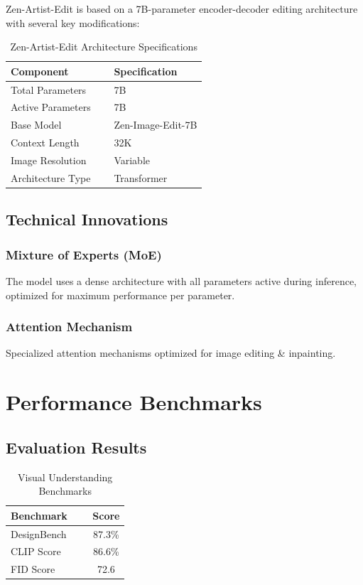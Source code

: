 \documentclass[11pt,a4paper]{article}
\begin{document}
Zen-Artist-Edit is based on a 7B-parameter encoder-decoder editing architecture with several key modifications:

\begin{table}[H]
\centering
\begin{tabular}{ll}
\toprule
\textbf{Component} \ \ &   \textbf{Specification} \\
\midrule
Total Parameters \ \ &   7B \\
Active Parameters \ \ &   7B \\
Base Model \ \ &   Zen-Image-Edit-7B \\
Context Length \ \ &   32K \\

Image Resolution \ \ &   Variable \\

Architecture Type \ \ &   Transformer \\
\bottomrule
\end{tabular}
\caption{Zen-Artist-Edit Architecture Specifications}
\end{table}

\subsection{Technical Innovations}

\subsubsection{Mixture of Experts (MoE)}
The model uses a dense architecture with all parameters active during inference, optimized for maximum performance per parameter.

\subsubsection{Attention Mechanism}
Specialized attention mechanisms optimized for image editing \&   inpainting.

\section{Performance Benchmarks}

\subsection{Evaluation Results}

\begin{table}[H]
\centering
\begin{tabular}{lc}
\toprule
\textbf{Benchmark} \ \ &   \textbf{Score} \\
\midrule
DesignBench \ \ &   87.3\% \\
CLIP Score \ \ &   86.6\% \\
FID Score \ \ &   72.6 \\
\bottomrule
\end{tabular}
\caption{Visual Understanding Benchmarks}
\end{table}
\end{document}
